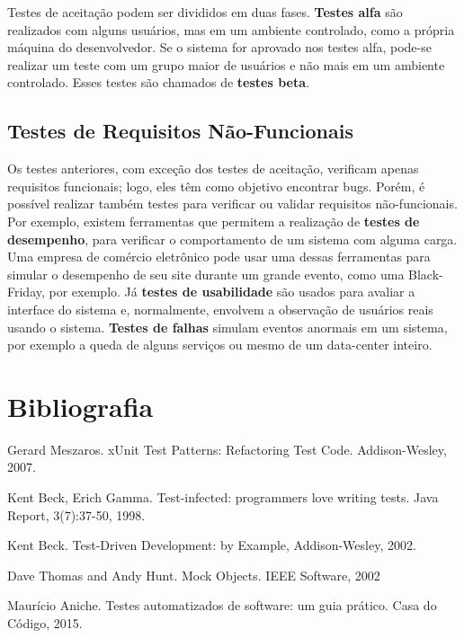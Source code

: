 \documentclass[
  11pt,
  twoside]{book}
\begin{document}
Testes de aceitação podem ser divididos em duas fases. \textbf{Testes
alfa} são realizados com alguns usuários, mas em um ambiente controlado,
como a própria máquina do desenvolvedor. Se o sistema for aprovado nos
testes alfa, pode-se realizar um teste com um grupo maior de usuários e
não mais em um ambiente controlado. Esses testes são chamados de
\textbf{testes beta}.

\hypertarget{testes-de-requisitos-nuxe3o-funcionais}{%
\subsection{Testes de Requisitos
Não-Funcionais}\label{testes-de-requisitos-nuxe3o-funcionais}}


Os testes anteriores, com exceção dos testes de aceitação, verificam
apenas requisitos funcionais; logo, eles têm como objetivo encontrar
bugs. Porém, é possível realizar também testes para verificar ou validar
requisitos não-funcionais. Por exemplo, existem ferramentas que permitem
a realização de \textbf{testes de desempenho}, para verificar o
comportamento de um sistema com alguma carga. Uma empresa de comércio
eletrônico pode usar uma dessas ferramentas para simular o desempenho de
seu site durante um grande evento, como uma Black-Friday, por exemplo.
Já \textbf{testes de usabilidade} são usados para avaliar a interface do
sistema e, normalmente, envolvem a observação de usuários reais usando o
sistema. \textbf{Testes de falhas} simulam eventos anormais em um
sistema, por exemplo a queda de alguns serviços ou mesmo de um
data-center inteiro.

\hypertarget{bibliografia-7}{%
\section*{Bibliografia}\label{bibliografia-7}}

Gerard Meszaros. xUnit Test Patterns: Refactoring Test Code.
Addison-Wesley, 2007.

Kent Beck, Erich Gamma. Test-infected: programmers love writing tests.
Java Report, 3(7):37-50, 1998.

Kent Beck. Test-Driven Development: by Example, Addison-Wesley, 2002.

Dave Thomas and Andy Hunt. Mock Objects. IEEE Software, 2002

Maurício Aniche. Testes automatizados de software: um guia prático. Casa
do Código, 2015.
\end{document}
